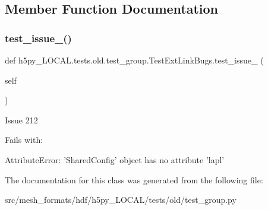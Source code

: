 \subsection{Member Function Documentation}
\mbox{\label{classh5py__LOCAL_1_1tests_1_1old_1_1test__group_1_1TestExtLinkBugs_aa6bf228f6fb84f95187e7844e97ffbd5}} 
\subsubsection{\texorpdfstring{test\+\_\+issue\+\_()}{test\_issue\_212()}}
{\footnotesize\ttfamily def h5py\+\_\+\+L\+O\+C\+A\+L.\+tests.\+old.\+test\+\_\+group.\+Test\+Ext\+Link\+Bugs.\+test\+\_\+issue\+\_ (\begin{DoxyParamCaption}\item[{}]{self }\end{DoxyParamCaption})}

\begin{DoxyVerb}Issue 212

Fails with:

AttributeError: 'SharedConfig' object has no attribute 'lapl'
\end{DoxyVerb}
 

The documentation for this class was generated from the following file\+:\begin{DoxyCompactItemize}
\item 
src/mesh\+\_\+formats/hdf/h5py\+\_\+\+L\+O\+C\+A\+L/tests/old/test\+\_\+group.\+py\end{DoxyCompactItemize}
